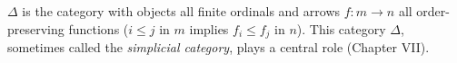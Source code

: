 $\Delta$ is the category with objects all finite ordinals and arrows $f : m \to n$ all order-preserving functions ($i \leq j$ in $m$ implies $f_i \leq f_j$ in $n$). This category $\Delta$, sometimes called the \emph{simplicial category}, plays a central role (Chapter VII).
